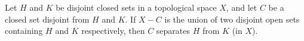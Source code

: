 Let $H$ and $K$ be disjoint closed sets in a topological space $X$, and let $C$ be a closed set disjoint from $H$ and $K$. If $X - C$ is the union of two disjoint open sets containing $H$ and $K$ respectively, then $C$ separates $H$ from $K$ (in $X$).
